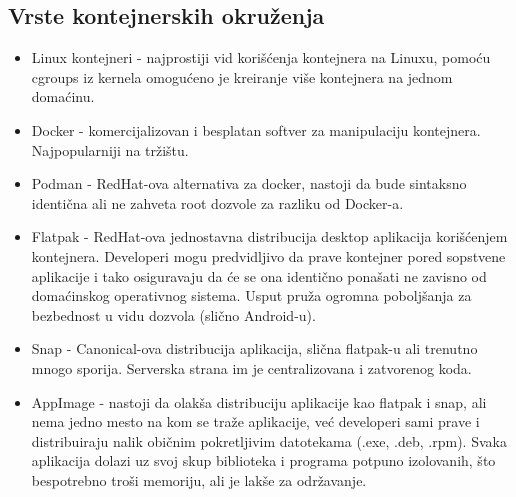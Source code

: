 \documentclass[a4paper,14pt]{article}
\begin{document}
\subsection{Vrste kontejnerskih okruženja}
\begin{itemize}
\item Linux kontejneri\cite{lxc} - najprostiji vid korišćenja kontejnera na Linuxu, pomoću cgroups iz kernela omogućeno je kreiranje više kontejnera na jednom domaćinu.
\item Docker\cite{docker} - komercijalizovan i besplatan softver za manipulaciju kontejnera. Najpopularniji na tržištu.
\item Podman\cite{podman} - RedHat-ova alternativa za docker, nastoji da bude sintaksno identična ali ne zahveta root dozvole za razliku od Docker-a.
\item Flatpak\cite{flatpak} - RedHat-ova jednostavna distribucija desktop aplikacija korišćenjem kontejnera. Developeri mogu predvidljivo da prave kontejner pored sopstvene aplikacije i tako osiguravaju da će se ona identično ponašati ne zavisno od domaćinskog operativnog sistema. Usput pruža ogromna poboljšanja za bezbednost u vidu dozvola (slično Android-u).
\item Snap\cite{snap} - Canonical-ova distribucija aplikacija, slična flatpak-u ali trenutno mnogo sporija. Serverska strana im je centralizovana i zatvorenog koda.
\item AppImage\cite{appimage} - nastoji da olakša distribuciju aplikacije kao flatpak i snap, ali nema jedno mesto na kom se traže aplikacije, već developeri sami prave i distribuiraju nalik običnim pokretljivim datotekama (.exe, .deb, .rpm). Svaka aplikacija dolazi uz svoj skup biblioteka i programa potpuno izolovanih, što bespotrebno troši memoriju, ali je lakše za održavanje.
\end{itemize}
\newpage
\end{document}
